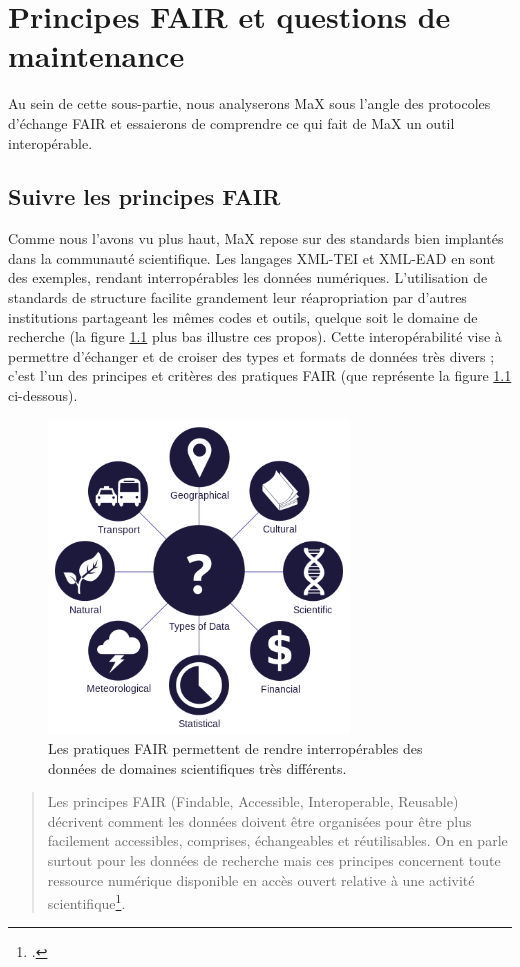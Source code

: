 \documentclass[a4paper,12pt,twoside]{book}
\begin{document}
\chapter{Principes FAIR et questions de maintenance}
Au sein de cette sous-partie, nous analyserons MaX sous l'angle des protocoles d'échange FAIR et essaierons de comprendre ce qui fait de MaX un outil interopérable.

\section{Suivre les principes FAIR}
Comme nous l'avons vu plus haut, MaX repose sur des standards bien implantés dans la communauté scientifique. Les langages XML-TEI et XML-EAD en sont des exemples, rendant interropérables les données numériques. L'utilisation de standards de structure facilite grandement leur réapropriation par d'autres institutions partageant les mêmes codes et outils,  quelque soit le domaine de recherche (la figure \ref{echange} plus bas illustre ces propos). Cette interopérabilité vise à permettre d'échanger et de croiser des types et formats de données très divers ; c'est l'un des principes et critères des pratiques FAIR (que représente la figure \ref{echange} ci-dessous).


\begin{figure}[H]
    \centering
    \includegraphics[width=8cm]{img/partie_2/Data_types.png}
    \caption{Les pratiques FAIR permettent de rendre interropérables des données de domaines scientifiques très différents.}
    \label{echange}
\end{figure}

\begin{quote}
    Les principes FAIR (Findable, Accessible, Interoperable, Reusable) décrivent comment les données doivent être organisées pour être plus facilement accessibles, comprises, échangeables et réutilisables. On en parle surtout pour les données de recherche mais ces principes concernent toute ressource numérique disponible en accès ouvert relative à une activité scientifique\footcite{FAIR}.
\end{quote}
\end{document}
